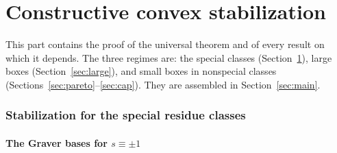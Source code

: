 \part{Constructive convex stabilization}

This part contains the proof of the universal theorem and of every result on which it depends. The three regimes are: the special classes (Section~\ref{sec:special-stab}), large boxes (Section~\ref{sec:large}), and small boxes in nonspecial classes (Sections~\ref{sec:pareto}--\ref{sec:cap}). They are assembled in Section~\ref{sec:main}.

\section{Stabilization for the special residue classes}\label{sec:special-stab}

\subsection{\texorpdfstring{The Graver bases for $s\equiv\pm1$}{The Graver bases for s = +-1}}

